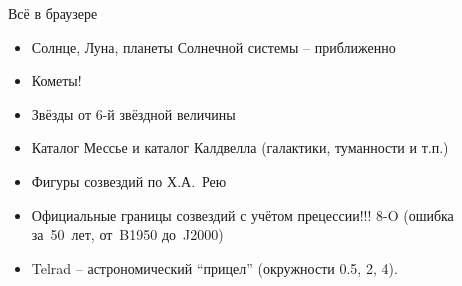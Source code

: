 \begin{frame}{Всё в браузере}
  \begin{itemize}
  \item Солнце, Луна, планеты Солнечной системы -- приближенно
  \item Кометы!
  \item Звёзды от 6-й звёздной величины
  \item Каталог Мессье и каталог Калдвелла (галактики, туманности и т.п.)
  \item Фигуры созвездий по Х.\thinsp{}А.~Рею
  \item Официальные границы созвездий с учётом прецессии!!! 8-O
    (ошибка за~50~лет, от~B1950 до~J2000)
  \item Telrad -- астрономический ``прицел'' (окружности
    0.5\textdegree{}, 2\textdegree{}, 4\textdegree{}).
  \end{itemize}
\end{frame}
